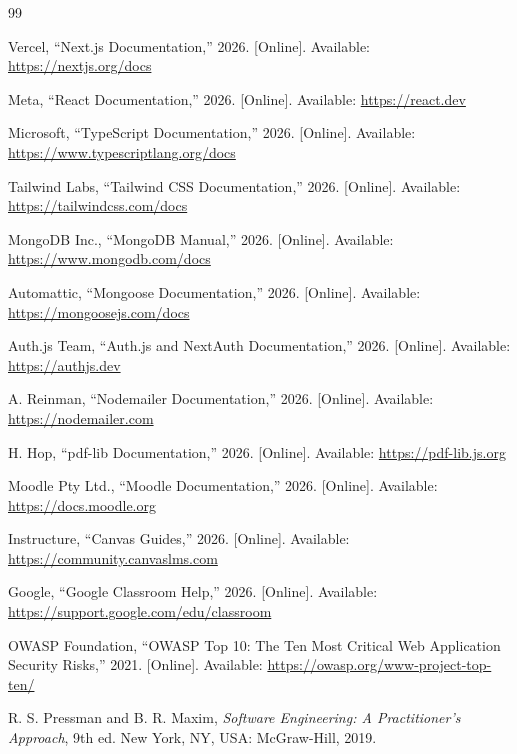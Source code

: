 \documentclass[12pt,a4paper]{report}
\begin{document}
\clearpage
{}
\begin{thebibliography}{99}

Vercel, ``Next.js Documentation,'' 2026. [Online]. Available: \url{https://nextjs.org/docs}

Meta, ``React Documentation,'' 2026. [Online]. Available: \url{https://react.dev}

Microsoft, ``TypeScript Documentation,'' 2026. [Online]. Available: \url{https://www.typescriptlang.org/docs}

Tailwind Labs, ``Tailwind CSS Documentation,'' 2026. [Online]. Available: \url{https://tailwindcss.com/docs}

MongoDB Inc., ``MongoDB Manual,'' 2026. [Online]. Available: \url{https://www.mongodb.com/docs}

Automattic, ``Mongoose Documentation,'' 2026. [Online]. Available: \url{https://mongoosejs.com/docs}

Auth.js Team, ``Auth.js and NextAuth Documentation,'' 2026. [Online]. Available: \url{https://authjs.dev}

A. Reinman, ``Nodemailer Documentation,'' 2026. [Online]. Available: \url{https://nodemailer.com}

H. Hop, ``pdf-lib Documentation,'' 2026. [Online]. Available: \url{https://pdf-lib.js.org}

Moodle Pty Ltd., ``Moodle Documentation,'' 2026. [Online]. Available: \url{https://docs.moodle.org}

Instructure, ``Canvas Guides,'' 2026. [Online]. Available: \url{https://community.canvaslms.com}

Google, ``Google Classroom Help,'' 2026. [Online]. Available: \url{https://support.google.com/edu/classroom}

OWASP Foundation, ``OWASP Top 10: The Ten Most Critical Web Application Security Risks,'' 2021. [Online]. Available: \url{https://owasp.org/www-project-top-ten/}

R. S. Pressman and B. R. Maxim, \emph{Software Engineering: A Practitioner's Approach}, 9th ed. New York, NY, USA: McGraw-Hill, 2019.

\end{thebibliography}
\end{document}
